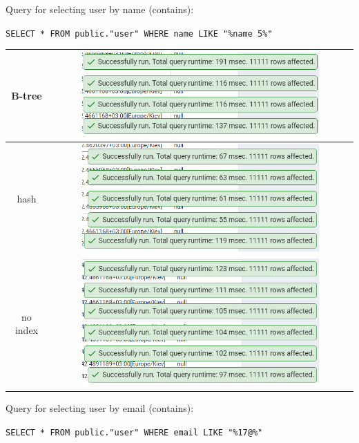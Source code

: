 \newpage
Query for selecting user by name (contains):

\texttt{SELECT * FROM public."user" WHERE name LIKE "\%name 5\%"}

\begin{center}
    \begin{tabular}{ | c | c |}
        \hline
        B-tree   & \includegraphics[width=0.8\textwidth]{images/query_select_user_by_name_like_performance_b_tree}   \\ \hline
        hash     & \includegraphics[width=0.8\textwidth]{images/query_select_user_by_name_like_performance_hash}     \\ \hline
        no index & \includegraphics[width=0.8\textwidth]{images/query_select_user_by_name_like_performance_no_index} \\ \hline
    \end{tabular}
\end{center}

\newpage
Query for selecting user by email (contains):

\texttt{SELECT * FROM public."user" WHERE email LIKE "\%17@\%"}

